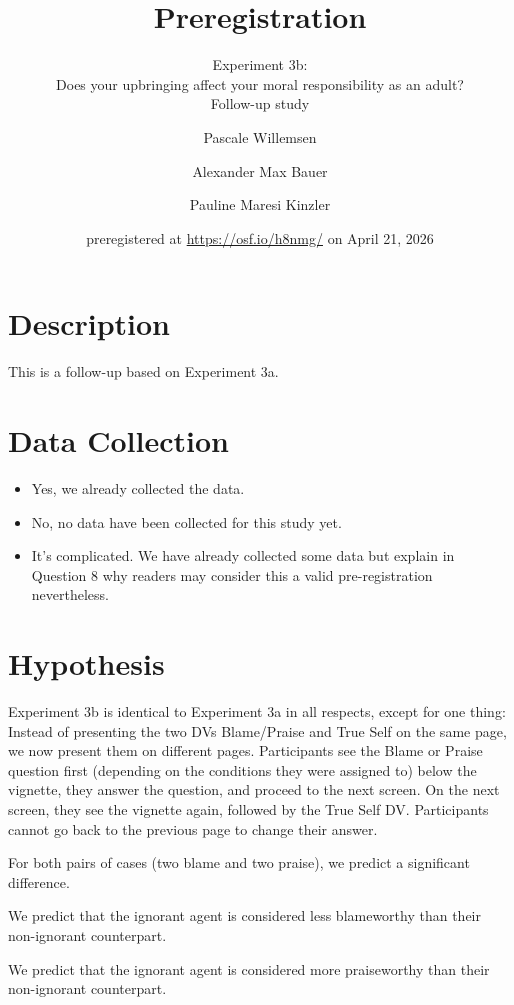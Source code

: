 \documentclass[scrarticle]{scrartcl}
\title{Preregistration}
\subtitle{Experiment 3b:\\Does your upbringing affect your moral responsibility as an adult?\\Follow-up study}
\author[1]{Pascale Willemsen}
\author[2]{Alexander Max Bauer}
\author[1]{Pauline Maresi Kinzler }
\affil[1]{ University of Zurich}
\affil[2]{ Carl von Ossietzky University of Oldenburg}
\date{\small preregistered at \url{https://osf.io/h8nmg/} on April 21, 2026}
\begin{document}
\maketitle


\clearpage
\section{Description}
This is a follow-up based on Experiment 3a.


\section{Data Collection}
\begin{itemize}[label=\Square,noitemsep]
   \item Yes, we already collected the data.
   \item[\XBox] No, no data have been collected for this study yet.
   \item It's complicated. We have already collected some data but explain in Question $8$ why readers may consider this a valid pre-registration nevertheless.
\end{itemize}


\section{Hypothesis}
Experiment 3b is identical to Experiment 3a in all respects, except for one thing:
Instead of presenting the two DVs Blame/Praise and True Self on the same page, we now present them on different pages.
Participants see the Blame or Praise question first (depending on the conditions they were assigned to) below the vignette, they answer the question, and proceed to the next screen.
On the next screen, they see the vignette again, followed by the True Self DV.
Participants cannot go back to the previous page to change their answer.

For both pairs of cases (two blame and two praise), we predict a significant difference.

We predict that the ignorant agent is considered less blameworthy than their non-ignorant counterpart.

We predict that the ignorant agent is considered more praiseworthy than their non-ignorant counterpart.


\end{document}

